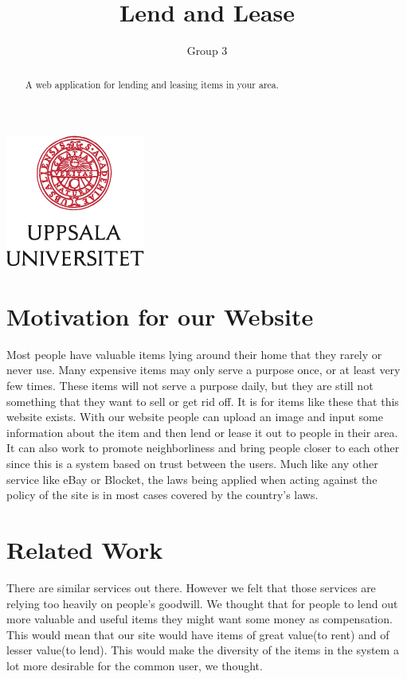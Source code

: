 \documentclass[a4paper]{article}
\title{Lend and Lease}
\author{Group 3}
\begin{document}
\maketitle
\begin{center}
\includegraphics{logo.png}\\[1cm]
\begin{abstract}
A web application for lending and leasing items in your area.
\end{abstract}
\end{center}
\newpage
\tableofcontents
\newpage

\section{Motivation for our Website}
Most people have valuable items lying around their home that they rarely or never use. Many expensive items may only serve a purpose once, or at least very few times. These items will not serve a purpose daily, but they are still not something that they want to sell or get rid off. It is for items like these that this website exists. 
With our website people can upload an image and input some information about the item and then lend or lease it out to people in their area. It can also work to promote neighborliness and bring people closer to each other since this is a system based on trust between the users. \newline Much like any other service like eBay or Blocket, the laws being applied when acting against the policy of the site is in most cases covered by the country's laws.
\section{Related Work }  
There are similar services out there. However we felt that those services are relying too heavily on people's goodwill. We thought that for people to lend out more valuable and useful items they might want some money as compensation. This would mean that our site would have items of great value(to rent) and of lesser value(to lend). This would make the diversity of the items in the system a lot more desirable for the common user, we thought.
 
\end{document}
